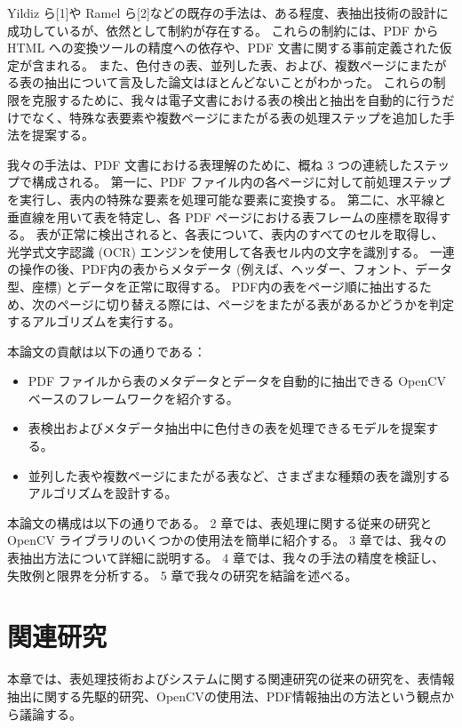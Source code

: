 \documentclass[uplatex, twocolumn,10pt]{jsarticle}
\begin{document}
Yildiz ら[1]や Ramel ら[2]などの既存の手法は、ある程度、表抽出技術の設計に成功しているが、依然として制約が存在する。
これらの制約には、PDF から HTML への変換ツールの精度への依存や、PDF 文書に関する事前定義された仮定が含まれる。
また、色付きの表、並列した表、および、複数ページにまたがる表の抽出について言及した論文はほとんどないことがわかった。
これらの制限を克服するために、我々は電子文書における表の検出と抽出を自動的に行うだけでなく、特殊な表要素や複数ページにまたがる表の処理ステップを追加した手法を提案する。

我々の手法は、PDF 文書における表理解のために、概ね 3 つの連続したステップで構成される。
第一に、PDF ファイル内の各ページに対して前処理ステップを実行し、表内の特殊な要素を処理可能な要素に変換する。
第二に、水平線と垂直線を用いて表を特定し、各 PDF ページにおける表フレームの座標を取得する。
表が正常に検出されると、各表について、表内のすべてのセルを取得し、光学式文字認識 (OCR) エンジンを使用して各表セル内の文字を識別する。
一連の操作の後、PDF内の表からメタデータ (例えば、ヘッダー、フォント、データ型、座標) とデータを正常に取得する。
PDF内の表をページ順に抽出するため、次のページに切り替える際には、ページをまたがる表があるかどうかを判定するアルゴリズムを実行する。

本論文の貢献は以下の通りである：
\begin{itemize}
    \item PDF ファイルから表のメタデータとデータを自動的に抽出できる OpenCV ベースのフレームワークを紹介する。
    \item 表検出およびメタデータ抽出中に色付きの表を処理できるモデルを提案する。
    \item 並列した表や複数ページにまたがる表など、さまざまな種類の表を識別するアルゴリズムを設計する。
\end{itemize}

本論文の構成は以下の通りである。
2 章では、表処理に関する従来の研究と OpenCV ライブラリのいくつかの使用法を簡単に紹介する。
3 章では、我々の表抽出方法について詳細に説明する。
4 章では、我々の手法の精度を検証し、失敗例と限界を分析する。
5 章で我々の研究を結論を述べる。


\section{関連研究}

本章では、表処理技術およびシステムに関する関連研究の従来の研究を、表情報抽出に関する先駆的研究、OpenCVの使用法、PDF情報抽出の方法という観点から議論する。
\end{document}

